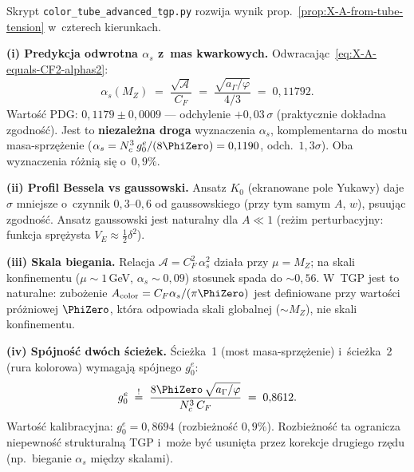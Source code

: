 \begin{remark}%
\label{rem:X-tube-advanced}
Skrypt \texttt{color\_tube\_advanced\_tgp.py} rozwija
wynik prop.~\ref{prop:X-A-from-tube-tension} w~czterech kierunkach.

\medskip\noindent
\textbf{(i) Predykcja odwrotna $\alpha_s$ z~mas kwarkowych.}
Odwracaj\k{a}c~\eqref{eq:X-A-equals-CF2-alphas2}:
\begin{equation}\label{eq:X-alpha-s-inverse}
  \alpha_s(M_Z)
  \;=\;
  \frac{\sqrt{\mathcal{A}}}{C_F}
  \;=\;
  \frac{\sqrt{a_\Gamma/\varphi}}{4/3}
  \;=\; 0{,}11792.
\end{equation}
Warto\'s\'c PDG: $0{,}1179 \pm 0{,}0009$ ---
odchylenie $+0{,}03\,\sigma$ (praktycznie dok\l{}adna zgodno\'s\'c).
Jest to \textbf{niezale\.zna droga} wyznaczenia $\alpha_s$,
komplementarna do mostu masa-sprz\k{e}\.zenie
($\alpha_s = N_c^3\,g_0^e/(8\PhiZero) = 0{,}1190$, odch.\ $1{,}3\sigma$).
Oba wyznaczenia r\'o\.zni\k{a} si\k{e} o~$0{,}9\%$.

\medskip\noindent
\textbf{(ii) Profil Bessela vs gaussowski.}
Ansatz $K_0$ (ekranowane pole Yukawy) daje $\hat\sigma$
mniejsze o~czynnik $0{,}3$--$0{,}6$ od gaussowskiego
(przy tym samym $A$, $w$), psuuj\k{a}c zgodno\'s\'c.
Ansatz gaussowski jest naturalny dla $A \ll 1$ (re\.zim perturbacyjny:
funkcja spr\k{e}\.zysta $V_E \approx \frac{1}{2}\delta^2$).

\medskip\noindent
\textbf{(iii) Skala biegania.}
Relacja $\mathcal{A} = C_F^2\,\alpha_s^2$ dzia\l{}a przy $\mu = M_Z$;
na skali konfinementu ($\mu \sim 1$\,GeV, $\alpha_s \sim 0{,}09$)
stosunek spada do $\sim 0{,}56$. W~TGP jest to naturalne: zubo\.zenie
$A_{\rm color} = C_F\alpha_s/(\pi\PhiZero)$ jest definiowane
przy warto\'sci pr\'o\.zniowej $\PhiZero$, kt\'ora odpowiada
skali globalnej ($\sim M_Z$), nie skali konfinementu.

\medskip\noindent
\textbf{(iv) Sp\'ojno\'s\'c dw\'och \'scie\.zek.}
\'Scie\.zka~1 (most masa-sprz\k{e}\.zenie) i~\'scie\.zka~2 (rura kolorowa)
wymagaj\k{a} sp\'ojnego $g_0^e$:
\begin{equation}
  g_0^e
  \;\stackrel{!}{=}\;
  \frac{8\PhiZero\,\sqrt{a_\Gamma/\varphi}}{N_c^3\,C_F}
  \;=\; 0{,}8612.
\end{equation}
Warto\'s\'c kalibracyjna: $g_0^e = 0{,}8694$ (rozbie\.zno\'s\'c $0{,}9\%$).
Rozbie\.zno\'s\'c ta ogranicza niepewno\'s\'c strukturaln\k{a} TGP
i~mo\.ze by\'c usuni\k{e}ta przez korekcje drugiego rz\k{e}du
(np.~bieganie $\alpha_s$ mi\k{e}dzy skalami).
\end{remark}

